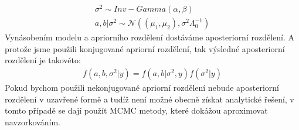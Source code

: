 \documentclass[czech,master,public,dept470,male,cpdeclaration,oneside, python]{diploma}
\begin{document}
\begin{align}
	\sigma^2 \sim Inv-Gamma(\alpha, \beta) \\
	a, b | \sigma^2 \sim \mathcal{N}((\mu_1, \mu_2), \sigma^2\Lambda_0^{-1})
\end{align}
Vynásobením modelu a apriorního rozdělení dostáváme aposteriorní rozdělení. A protože jsme použili konjugované apriorní rozdělení, tak výsledné aposteriorní rozdělení je takovéto:
\begin{align}
	f(a, b, \sigma^2 | y) = f(a, b | \sigma^2, y) f(\sigma^2 | y)
\end{align}
Pokud bychom použili nekonjugované apriorní rozdělení nebude aposteriorní rozdělení v uzavřené formě a tudíž není možné obecně získat analytické řešení, v tomto případě se dají použít MCMC metody, které dokážou aproximovat navzorkováním.
\end{document}
